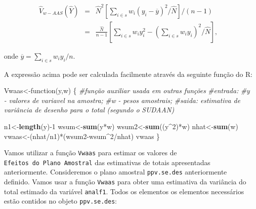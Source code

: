 \documentclass[]{book}
\newenvironment{Shaded}{\begin{snugshade}}{\end{snugshade}}
\newcommand{\KeywordTok}[1]{\textcolor[rgb]{0.13,0.29,0.53}{\textbf{{#1}}}}
\newcommand{\DecValTok}[1]{\textcolor[rgb]{0.00,0.00,0.81}{{#1}}}
\newcommand{\StringTok}[1]{\textcolor[rgb]{0.31,0.60,0.02}{{#1}}}
\newcommand{\CommentTok}[1]{\textcolor[rgb]{0.56,0.35,0.01}{\textit{{#1}}}}
\newcommand{\NormalTok}[1]{{#1}}
\numberwithin{example}{chapter}
\numberwithin{remark}{chapter}
\numberwithin{definition}{chapter}
\begin{document}
\begin{eqnarray*}
\widehat{V}_{w-AAS}\left(\widehat{Y}\right)&=& \widehat{N}^2\left[\sum_{i \in s}w_i\left(y_i-\overline{y}\right)^2/\widehat{N}\right]/(n-1)\\
&=&\frac{\widehat{N}}{n-1}\left[\sum_{i \in s}w_iy_i^2-\left(\sum_{i \in s}w_iy_i\right)^2/\widehat{N}\right],
\end{eqnarray*}

onde \(\overline{y}=\sum_{i \in s}w_iy_i/n\).

A expressão acima pode ser calculada facilmente através da seguinte
função do R:

\begin{Shaded}
\begin{Highlighting}[]
\NormalTok{Vwaas<-function(y,w)}
\NormalTok{\{}
\CommentTok{#função auxiliar usada em outras funções}
\CommentTok{#entrada:}
\CommentTok{#y - valores de variavel na amostra;}
\CommentTok{#w - pesos amostrais;}
\CommentTok{#saida:  estimativa de variância de desenho para o total (segundo o SUDAAN)}

\NormalTok{n1<-}\KeywordTok{length}\NormalTok{(y)-}\DecValTok{1}
\NormalTok{wsum<-}\KeywordTok{sum}\NormalTok{(y*w)}
\NormalTok{wsum2<-}\KeywordTok{sum}\NormalTok{((y^}\DecValTok{2}\NormalTok{)*w)}
\NormalTok{nhat<-}\KeywordTok{sum}\NormalTok{(w)}
\NormalTok{vwaas<-(nhat/n1)*(wsum2-wsum^}\DecValTok{2}\NormalTok{/nhat)}
\NormalTok{vwaas}
\NormalTok{\}}
\end{Highlighting}
\end{Shaded}

Vamos utilizar a função \texttt{Vwaas} para estimar os valores de
\texttt{Efeitos\ do\ Plano\ Amostral} das estimativas de totais
apresentadas anteriormente. Consideremos o plano amostral
\texttt{ppv.se.des} anteriormente definido. Vamos usar a função
\texttt{Vwaas} para obter uma estimativa da variância do total estimado
da variável \texttt{analf1}. Todos os elementos os elementos necessários
estão contidos no objeto \texttt{ppv.se.des}:

\begin{Shaded}
\end{Shaded}
\end{document}
